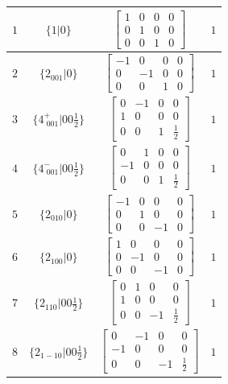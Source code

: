 \documentclass[fleqn,8pt]{jsarticle}
\begin{document}
\begin{longtable}{cccc}
$ 1 $ & $ \{1|0\} $ & $ \begin{bmatrix} 1 & 0 & 0 & 0 \\ 0 & 1 & 0 & 0 \\ 0 & 0 & 1 & 0 \end{bmatrix} $ & $ 1 $ \\ \hline
$ 2 $ & $ \{2{}_{001}|0\} $ & $ \begin{bmatrix} -1 & 0 & 0 & 0 \\ 0 & -1 & 0 & 0 \\ 0 & 0 & 1 & 0 \end{bmatrix} $ & $ 1 $ \\ \hline
$ 3 $ & $ \{4^{+}_{\,\,001}|0 0 \frac{1}{2}\} $ & $ \begin{bmatrix} 0 & -1 & 0 & 0 \\ 1 & 0 & 0 & 0 \\ 0 & 0 & 1 & \frac{1}{2} \end{bmatrix} $ & $ 1 $ \\ \hline
$ 4 $ & $ \{4^{-}_{\,\,001}|0 0 \frac{1}{2}\} $ & $ \begin{bmatrix} 0 & 1 & 0 & 0 \\ -1 & 0 & 0 & 0 \\ 0 & 0 & 1 & \frac{1}{2} \end{bmatrix} $ & $ 1 $ \\ \hline
$ 5 $ & $ \{2{}_{010}|0\} $ & $ \begin{bmatrix} -1 & 0 & 0 & 0 \\ 0 & 1 & 0 & 0 \\ 0 & 0 & -1 & 0 \end{bmatrix} $ & $ 1 $ \\ \hline
$ 6 $ & $ \{2{}_{100}|0\} $ & $ \begin{bmatrix} 1 & 0 & 0 & 0 \\ 0 & -1 & 0 & 0 \\ 0 & 0 & -1 & 0 \end{bmatrix} $ & $ 1 $ \\ \hline
$ 7 $ & $ \{2{}_{110}|0 0 \frac{1}{2}\} $ & $ \begin{bmatrix} 0 & 1 & 0 & 0 \\ 1 & 0 & 0 & 0 \\ 0 & 0 & -1 & \frac{1}{2} \end{bmatrix} $ & $ 1 $ \\ \hline
$ 8 $ & $ \{2{}_{1-10}|0 0 \frac{1}{2}\} $ & $ \begin{bmatrix} 0 & -1 & 0 & 0 \\ -1 & 0 & 0 & 0 \\ 0 & 0 & -1 & \frac{1}{2} \end{bmatrix} $ & $ 1 $ \\ \hline

\end{longtable}
\end{document}
